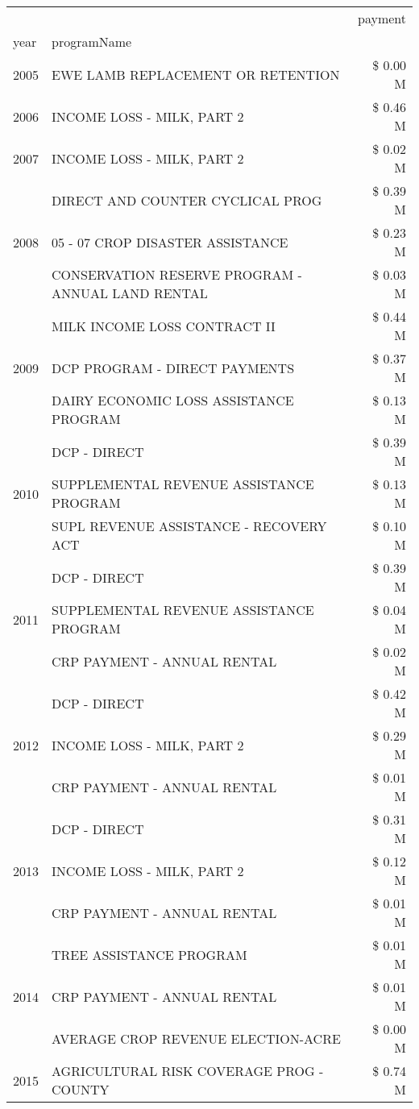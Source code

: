 \begin{tabular}{llr}
\toprule
 &  & payment \\
year & programName &  \\
\midrule
2005 & EWE LAMB REPLACEMENT OR RETENTION & \$ 0.00 M \\
\cline{1-3}
2006 & INCOME LOSS - MILK, PART 2 & \$ 0.46 M \\
\cline{1-3}
2007 & INCOME LOSS - MILK, PART 2 & \$ 0.02 M \\
\cline{1-3}
\multirow[t]{3}{*}{2008} & DIRECT AND COUNTER CYCLICAL PROG & \$ 0.39 M \\
 & 05 - 07 CROP DISASTER ASSISTANCE & \$ 0.23 M \\
 & CONSERVATION RESERVE PROGRAM - ANNUAL LAND RENTAL & \$ 0.03 M \\
\cline{1-3}
\multirow[t]{3}{*}{2009} & MILK INCOME LOSS CONTRACT II & \$ 0.44 M \\
 & DCP PROGRAM - DIRECT PAYMENTS & \$ 0.37 M \\
 & DAIRY ECONOMIC LOSS ASSISTANCE PROGRAM & \$ 0.13 M \\
\cline{1-3}
\multirow[t]{3}{*}{2010} & DCP - DIRECT & \$ 0.39 M \\
 & SUPPLEMENTAL REVENUE ASSISTANCE PROGRAM & \$ 0.13 M \\
 & SUPL REVENUE ASSISTANCE - RECOVERY ACT & \$ 0.10 M \\
\cline{1-3}
\multirow[t]{3}{*}{2011} & DCP - DIRECT & \$ 0.39 M \\
 & SUPPLEMENTAL REVENUE ASSISTANCE PROGRAM & \$ 0.04 M \\
 & CRP PAYMENT - ANNUAL RENTAL & \$ 0.02 M \\
\cline{1-3}
\multirow[t]{3}{*}{2012} & DCP - DIRECT & \$ 0.42 M \\
 & INCOME LOSS - MILK, PART 2 & \$ 0.29 M \\
 & CRP PAYMENT - ANNUAL RENTAL & \$ 0.01 M \\
\cline{1-3}
\multirow[t]{3}{*}{2013} & DCP - DIRECT & \$ 0.31 M \\
 & INCOME LOSS - MILK, PART 2 & \$ 0.12 M \\
 & CRP PAYMENT - ANNUAL RENTAL & \$ 0.01 M \\
\cline{1-3}
\multirow[t]{3}{*}{2014} & TREE ASSISTANCE PROGRAM & \$ 0.01 M \\
 & CRP PAYMENT - ANNUAL RENTAL & \$ 0.01 M \\
 & AVERAGE CROP REVENUE ELECTION-ACRE & \$ 0.00 M \\
\cline{1-3}
\multirow[t]{3}{*}{2015} & AGRICULTURAL RISK COVERAGE PROG - COUNTY & \$ 0.74 M \\

\end{tabular}
